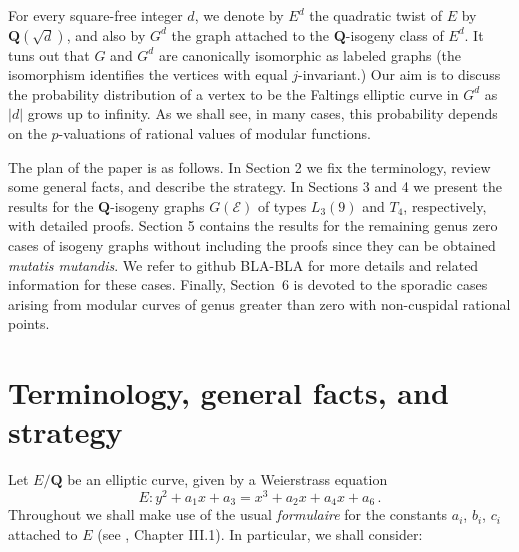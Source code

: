 \documentclass{ws-ijnt}
\begin{document}
For every square-free integer $d$, we denote by $E^d$ the quadratic twist of $E$ by $\mathbf{Q}(\sqrt{d})$, and also by $G^d$ the graph attached to the $\mathbf{Q}$-isogeny class of $E^d$.
It tuns out that $G$ and $G^d$ are canonically isomorphic as labeled graphs (the isomorphism identifies the vertices with equal $j$-invariant.) Our aim is to discuss the probability distribution of a vertex to be the Faltings elliptic curve in $G^d$ as $|d|$ grows up to infinity. 
As we shall see, in many cases, this probability depends on the $p$-valuations of rational values of modular functions.

The plan of the paper is as follows. In Section 2 we fix the terminology, review some general facts, and describe the strategy. In Sections 3 and 4 we present the results for the $\mathbf{Q}$-isogeny graphs $G({\mathcal E})$ of types $L_3(9)$ and $T_4$, respectively, with detailed proofs. Section 5 contains the results for the remaining genus zero cases of isogeny graphs without including the proofs since they can be obtained {\it mutatis mutandis}. We refer to github BLA-BLA for more details and related information for these cases. Finally, Section~6 is devoted to the sporadic cases arising from modular curves of genus greater than zero with non-cuspidal rational points.


\section{Terminology, general facts, and strategy}

Let $E/\mathbf{Q}$ be an elliptic curve, given by a Weierstrass equation
\begin{equation}
E\colon y^2+a_{1}x+a_{3}=x^3+a_{2}x+a_{4}x+a_{6}\,.
\label{Weiers_equation}
\end{equation}
Throughout we shall make use of the usual {\it formulaire} for the constants $a_i$, $b_i$, $c_i$ attached to $E$ (see \cite{Sil}, Chapter III.1). In particular, we shall consider:  
\end{document}
